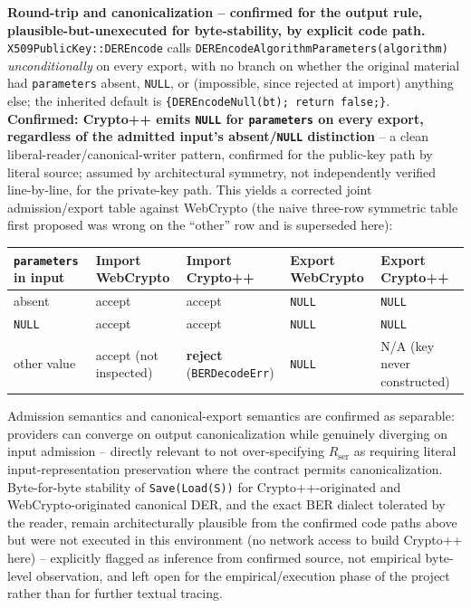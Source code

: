 \documentclass[11pt,a4paper]{article}
\begin{document}
\textbf{Round-trip and canonicalization -- confirmed for the output rule, plausible-but-unexecuted for byte-stability, by explicit code path.} \texttt{X509PublicKey::DEREncode} calls \texttt{DEREncodeAlgorithmParameters(algorithm)} \emph{unconditionally} on every export, with no branch on whether the original material had \texttt{parameters} absent, \texttt{NULL}, or (impossible, since rejected at import) anything else; the inherited default is \texttt{\{DEREncodeNull(bt); return false;\}}. \textbf{Confirmed: Crypto++ emits \texttt{NULL} for \texttt{parameters} on every export, regardless of the admitted input's absent/\texttt{NULL} distinction} -- a clean liberal-reader/canonical-writer pattern, confirmed for the public-key path by literal source; assumed by architectural symmetry, not independently verified line-by-line, for the private-key path. This yields a corrected joint admission/export table against WebCrypto (the naive three-row symmetric table first proposed was wrong on the ``other'' row and is superseded here):
\begin{center}
\begin{tabularx}{\textwidth}{@{}l l l l l@{}}
\toprule
\texttt{parameters} in input & Import WebCrypto & Import Crypto++ & Export WebCrypto & Export Crypto++ \\
\midrule
absent & accept & accept & \texttt{NULL} & \texttt{NULL} \\
\texttt{NULL} & accept & accept & \texttt{NULL} & \texttt{NULL} \\
other value & accept (not inspected) & \textbf{reject} (\texttt{BERDecodeErr}) & \texttt{NULL} & N/A (key never constructed) \\
\bottomrule
\end{tabularx}
\end{center}
Admission semantics and canonical-export semantics are confirmed as separable: providers can converge on output canonicalization while genuinely diverging on input admission -- directly relevant to not over-specifying $R_{\text{ser}}$ as requiring literal input-representation preservation where the contract permits canonicalization. Byte-for-byte stability of \texttt{Save(Load(S))} for Crypto++-originated and WebCrypto-originated canonical DER, and the exact BER dialect tolerated by the reader, remain architecturally plausible from the confirmed code paths above but were not executed in this environment (no network access to build Crypto++ here) -- explicitly flagged as inference from confirmed source, not empirical byte-level observation, and left open for the empirical/execution phase of the project rather than for further textual tracing.
\end{document}
